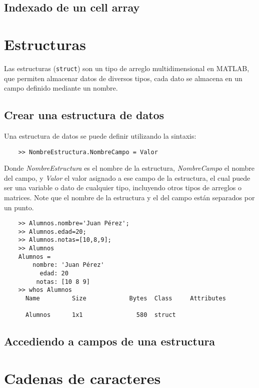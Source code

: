 \subsection{Indexado de un cell array}


\section{Estructuras}

Las estructuras (\texttt{struct}) son un tipo de arreglo multidimensional en MATLAB, que permiten almacenar 
datos de diversos tipos, cada dato se almacena en un campo definido mediante un nombre.

\subsection{Crear una estructura de datos}

Una estructura de datos se puede definir utilizando la sintaxis:

\begin{verbatim}
	>> NombreEstructura.NombreCampo = Valor
\end{verbatim}

Donde \textit{NombreEstructura} es el nombre de la estructura, \textit{NombreCampo} el nombre del campo, y \textit{Valor} 
el valor asignado a ese campo de la estructura, el cual puede ser una variable o dato de cualquier tipo, incluyendo 
otros tipos de arreglos o matrices. Note que el nombre de la estructura y el del campo están separados por un punto.\\





\begin{verbatim}
	>> Alumnos.nombre='Juan Pérez';
	>> Alumnos.edad=20;
	>> Alumnos.notas=[10,8,9];
	>> Alumnos
	Alumnos = 
	    nombre: 'Juan Pérez'
	      edad: 20
	     notas: [10 8 9]
	>> whos Alumnos
	  Name         Size            Bytes  Class     Attributes

	  Alumnos      1x1               580  struct      
\end{verbatim}

\subsection{Accediendo a campos de una estructura}



\section{Cadenas de caracteres}

